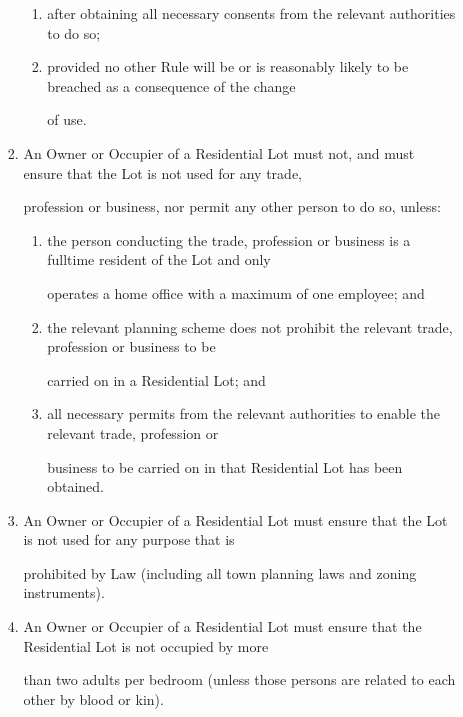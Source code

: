 \documentclass{article}
\begin{document}
\begin{enumerate}[label=\arabic*.]
\begin{enumerate}[label=\arabic{enumi}.\arabic*.]
\begin{enumerate}[label=(\arabic*)]
\begin{enumerate}[label=(\alph*)]
\item {\fontsize{9.962}{1} after obtaining all necessary consents from the relevant authorities to do so; }

\item {\fontsize{9.962}{1} provided no other Rule will be or is reasonably likely to be breached as a consequence of the change }

{\fontsize{10.02}{1}of use. }

\end{enumerate}
\item {\fontsize{9.962}{1} An Owner or Occupier of a Residential Lot must not, and must ensure that the Lot is not used for any trade, }

{\fontsize{10.02}{1}profession or business, nor permit any other person to do so, unless: }

\begin{enumerate}[label=(\alph*)]
\item {\fontsize{9.962}{1} the person conducting the trade, profession or business is a fulltime resident of the Lot and only }

\newpage

{\fontsize{10.02}{1}operates a home office with a maximum of one employee; and }

\item {\fontsize{9.962}{1} the relevant planning scheme does not prohibit the relevant trade, profession or business to be }

{\fontsize{10.02}{1}carried on in a Residential Lot; and }

\item {\fontsize{9.962}{1} all necessary permits from the relevant authorities to enable the relevant trade, profession or }

{\fontsize{10.02}{1}business to be carried on in that Residential Lot has been obtained. }

\end{enumerate}
\item {\fontsize{9.962}{1} An Owner or Occupier of a Residential Lot must ensure that the Lot is not used for any purpose that is }

{\fontsize{10.02}{1}prohibited by Law (including all town planning laws and zoning instruments). }

\item {\fontsize{9.962}{1} An Owner or Occupier of a Residential Lot must ensure that the Residential Lot is not occupied by more }

{\fontsize{10.02}{1}than two adults per bedroom (unless those persons are related to each other by blood or kin). }


\end{enumerate}
\end{enumerate}
\end{enumerate}
\end{document}

